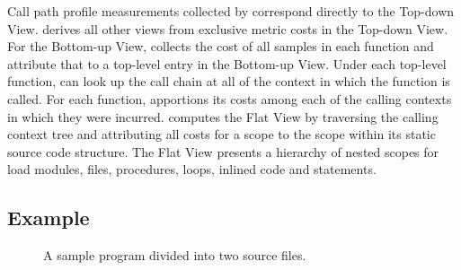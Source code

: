 Call path profile measurements collected by \hpcrun{} correspond directly to the Top-down View.
\hpcviewer{} derives all other views from exclusive metric costs in the Top-down View.
For the Bottom-up View, \hpcviewer{} collects the cost of all samples in each function and attribute that to a top-level entry in the Bottom-up View.
Under each top-level function, \hpcviewer{} can look up the call chain at all of the context in which the function is called.
For each function, \hpcviewer{} apportions its costs among each of the calling contexts in which they were incurred.
\hpcviewer{} computes the Flat View by traversing the calling context tree and attributing all costs for a scope to the scope within its static source code structure.
The Flat View presents a hierarchy of nested scopes for load modules, files, procedures, loops, inlined code and statements.



\subsection{Example}

\begin{figure}[t]
\caption{A sample program divided into two source files.}
\label{fig:source-files}
\end{figure}



